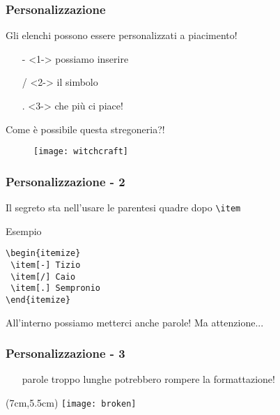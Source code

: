 \begin{frame}
 \frametitle{Personalizzazione}
 
 Gli elenchi possono essere personalizzati a piacimento!
 \begin{itemize}
  \item[-]<1-> possiamo inserire
  \item[/]<2-> il simbolo
  \item[.]<3-> che più ci piace!
 \end{itemize}

\end{frame}

\begin{frame}
 
 \begin{center}
  \huge Come è possibile questa stregoneria?!
 \end{center}
 
 \begin{figure}[h]
  \centering
  \texttt{[image: witchcraft]}
 \end{figure}

\end{frame}

\begin{frame}[fragile]
 \frametitle{Personalizzazione - 2}
 
 Il segreto sta nell'usare le parentesi quadre dopo \texttt{\textbackslash item}
 
 \begin{exampleblock}{Esempio}
 \begin{lstlisting}[frame = single, title={Una lista puntata personalizzata}] 
\begin{itemize}
 \item[-] Tizio
 \item[/] Caio
 \item[.] Sempronio
\end{itemize}
  \end{lstlisting}
 \end{exampleblock}
 
 All'interno possiamo metterci anche parole! Ma attenzione...
\end{frame}

\begin{frame}
 \frametitle{Personalizzazione - 3}
 
 \begin{itemize}
  \item[parole troppo lunghe] potrebbero rompere la formattazione!
 \end{itemize}

  
 \begin{textblock*}{5cm}(7cm,5.5cm)
   \texttt{[image: broken]}
 \end{textblock*}
\end{frame}
